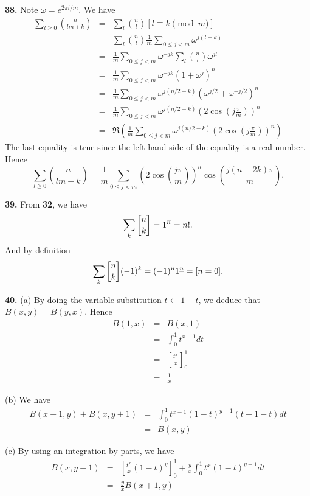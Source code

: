 \documentclass[a4paper,12pt]{article}
\newcommand{\newpar}[1]{\bigskip \noindent \textbf{#1.}}
\newcommand{\subpar}[1]{\medskip \noindent (#1)}
\newcommand{\stirlingone}[2]{{#1 \atopwithdelims[]#2}}
\newcommand{\la}{\leftarrow}
\begin{document}
\newpar{38} Note $\omega = e^{2\pi i/m}$.  We have
\begin{eqnarray*}
  \sum_{l\ge 0} {n \choose lm + k} &=& \sum_l {n \choose l} [ l \equiv
    k \pmod m ] \\
  &=& \sum_l {n \choose l} \frac{1}{m} \sum_{0 \le j < m}
  \omega^{j(l-k)} \\
  &=& \frac{1}{m} \sum_{0 \le j < m} \omega^{-jk} \sum_l {n \choose l}
  \omega^{jl} \\
  &=& \frac{1}{m} \sum_{0\le j < m} \omega^{-jk} (1+\omega^j)^n \\
  &=& \frac{1}{m} \sum_{0\le j <m} \omega^{j(n/2 - k)}
  \left(\omega^{j/2} + \omega^{-j/2}\right)^n \\
  &=& \frac{1}{m} \sum_{0\le j <m} \omega^{j(n/2 - k)} \left(2
  \cos\left(j\frac{\pi}{m}\right)\right)^n \\
  &=& \Re\left(\frac{1}{m} \sum_{0\le j <m} \omega^{j(n/2 - k)} \left(2
  \cos\left(j\frac{\pi}{m}\right)\right)^n \right)
\end{eqnarray*}
The last equality is true since the left-hand side of the equality is
a real number.  Hence
\[ \sum_{l\ge 0} {n \choose lm + k} = \frac{1}{m} \sum_{0\le j < m}
\left( 2 \cos\left(\frac{j\pi}{m} \right) \right)^n
\cos\left(\frac{j(n-2k)\pi}{m}\right).\]

\newpar{39} From \textbf{32}, we have
\[ \sum_k \stirlingone{n}{k} = 1^{\overline{n}} = n!.\]
And by definition
\[ \sum_k \stirlingone{n}{k}(-1)^k = (-1)^n 1^{\underline{n}} = [ n = 0].\]

\newpar{40} \subpar{a} By doing the variable substitution $t \la 1-t$,
we deduce that $B(x, y) = B(y, x)$.  Hence
\begin{eqnarray*}
  B(1, x) &=& B(x, 1) \\
  &=& \int_0^1 t^{x-1} dt \\
  &=& \left[ \frac{t^x}{x} \right]_0^1 \\
  &=& \frac{1}{x}
\end{eqnarray*}

\subpar{b} We have
\begin{eqnarray*}
  B(x+1, y) + B(x, y+1) &=& \int_0^1 t^{x-1}(1-t)^{y-1}(t + 1 - t)
  dt\\
  &=& B(x, y)
\end{eqnarray*}

\subpar{c} By using an integration by parts, we have
\begin{eqnarray*}
  B(x, y+1) &=& \left[ \frac{t^x}{x}(1-t)^y \right]_0^1 +
  \frac{y}{x}\int_0^1 t^x (1-t)^{y-1} dt \\
  &=& \frac{y}{x} B(x+1, y)
\end{eqnarray*}
\end{document}
